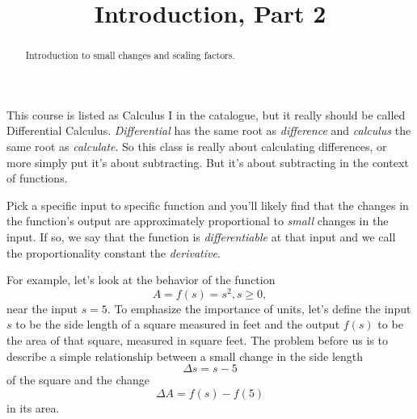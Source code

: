 \documentclass{ximera}
\title{Introduction, Part 2}
\begin{document}
\begin{abstract}
Introduction to small changes and scaling factors.
\end{abstract}
\maketitle


This course is listed as Calculus I in the catalogue, but it really should be called Differential Calculus. \emph{Differential} has the same root as \emph{difference} and \emph{calculus} the same root as \emph{calculate}. So this class is really about calculating differences, or more simply put it's about subtracting. But it's about subtracting in the context of functions. 


Pick a specific input to specific function and you'll likely find that the changes in the function's output are approximately proportional to \emph{small} changes in the input. If so, we say that the function is \emph{differentiable} at that input and we call the  proportionality constant the \emph{derivative}.

For example, let's look at the behavior of the function
\[
   A = f(s) = s^2 , s\geq 0,
\]
near the input $s=5$. To emphasize the importance of units, let's define the input $s$ to be the side length of a square measured in feet and the output $f(s)$ to be the area of that square, measured in square feet. The problem before us is to describe a simple relationship between a small change in the side length 
\[
     \Delta s = s -5
\]
of the square and the change 
\[
   \Delta A = f(s) - f(5)
\]
in its area. 
\end{document}
